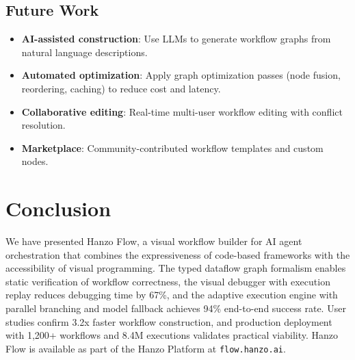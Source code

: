 \documentclass[11pt,twocolumn]{article}
\begin{document}
\subsection{Future Work}

\begin{itemize}[leftmargin=1.1em]
    \item \textbf{AI-assisted construction}: Use LLMs to generate workflow graphs from natural language descriptions.
    \item \textbf{Automated optimization}: Apply graph optimization passes (node fusion, reordering, caching) to reduce cost and latency.
    \item \textbf{Collaborative editing}: Real-time multi-user workflow editing with conflict resolution.
    \item \textbf{Marketplace}: Community-contributed workflow templates and custom nodes.
\end{itemize}

\section{Conclusion}
\label{sec:conclusion}

We have presented Hanzo Flow, a visual workflow builder for AI agent orchestration that combines the expressiveness of code-based frameworks with the accessibility of visual programming. The typed dataflow graph formalism enables static verification of workflow correctness, the visual debugger with execution replay reduces debugging time by 67\%, and the adaptive execution engine with parallel branching and model fallback achieves 94\% end-to-end success rate. User studies confirm 3.2x faster workflow construction, and production deployment with 1,200+ workflows and 8.4M executions validates practical viability. Hanzo Flow is available as part of the Hanzo Platform at \texttt{flow.hanzo.ai}.
\end{document}
